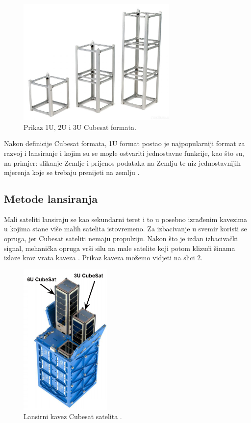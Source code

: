 \documentclass[times, utf8, diplomski, numeric]{templates/template}
\begin{document}
{{{                \begin{figure}[htb]
                \centering
                \includegraphics[width=0.7\textwidth]{images/cubesat_format.jpg}
                \caption{Prikaz 1U, 2U i 3U Cubesat formata.}
                \label{fig:cubesat_format}
                \end{figure}

                Nakon definicije Cubesat formata, 1U format postao je najpopularniji format za razvoj i lansiranje i kojim su se mogle ostvariti jednostavne funkcije, kao što su, na primjer: slikanje Zemlje i prijenos podataka na Zemlju te niz jednostavnijih mjerenja koje se trebaju prenijeti na zemlju \cite{fersat}.
            }
        }

        \subsection{Metode lansiranja}{
            Mali sateliti lansiraju se kao sekundarni teret i to u posebno izrađenim kavezima u kojima stane više malih satelita istovremeno. Za izbacivanje u svemir koristi se opruga, jer Cubesat sateliti nemaju propulziju. Nakon što je izdan izbacivački signal, mehanička opruga vrši silu na male satelite koji potom klizući šinama izlaze kroz vrata kaveza \cite{fersat}. Prikaz kaveza možemo vidjeti na slici \ref{fig:kavez}.

            \begin{figure}[htb]
            \centering
            \includegraphics[width=0.4\textwidth]{images/kavez.jpg}
            \caption{Lansirni kavez Cubesat satelita \cite{kavez_cite}.}
            \label{fig:kavez}
            \end{figure}

}}
\end{document}
